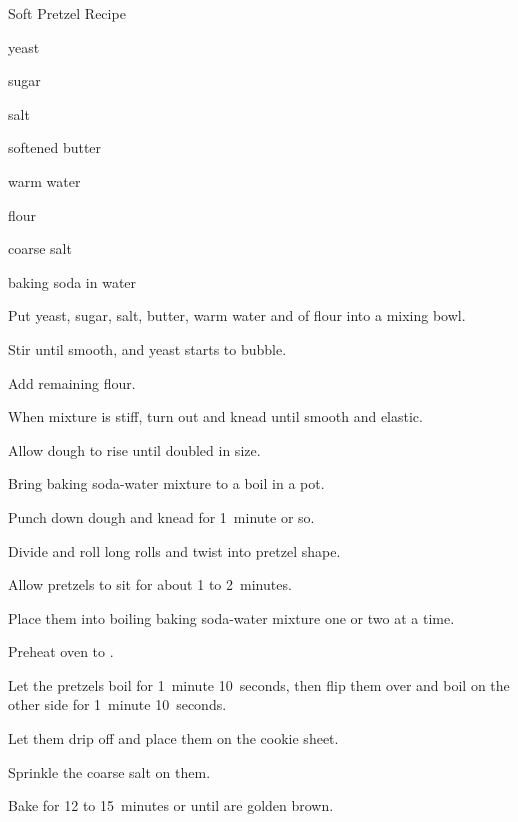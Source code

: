 \begin{recipe}{Soft Pretzel Recipe \UNTESTED}{}{}

\begin{ingredients}
\item {} yeast
\item {} sugar
\item {} salt
\item {} softened butter
\item {} warm water
\item \C{2\threequarter} flour
\item coarse salt
\item {} baking soda in  water
\end{ingredients}

\begin{directions}
\item Put yeast, sugar, salt, butter, warm water and  of flour into a mixing bowl.
\item Stir until smooth, and yeast starts to bubble.
\item Add remaining flour.
\item When mixture is stiff, turn out and knead until smooth and elastic.
\item Allow dough to rise until doubled in size.
\item Bring baking soda-water mixture to a boil in a pot.
\item Punch down dough and knead for 1~minute or so.
\item Divide and roll  long rolls and twist into pretzel shape.
\item Allow pretzels to sit for about 1 to 2~minutes.
\item Place them into boiling baking soda-water mixture one or two at a time.
\item Preheat oven to .
\item Let the pretzels boil for 1~minute 10~seconds, then flip them over and boil on the other side for 1~minute 10~seconds.
\item Let them drip off and place them on the cookie sheet.
\item Sprinkle the coarse salt on them.
\item Bake for 12 to 15~minutes or until are golden brown.
\end{directions}
\end{recipe}
